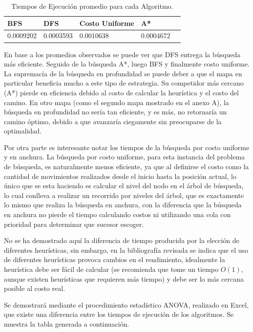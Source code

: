 \documentclass[letter, titlepage, 10pt]{article}
\begin{document}
\begin{table}[H]
\begin{center}
\begin{tabular}{|l|l|l|l|l|}
\hline
\textbf{BFS} & \textbf{DFS}  & \textbf{Costo Uniforme}   & \textbf{A*}   \\ \hline
0.0009202 & 0.0003593 & 0.0010638 & 0.0004672
\\ \hline
\end{tabular}
\caption{Tiempos de Ejecución promedio para cada Algoritmo.}
\end{center}
\end{table}

En base a los promedios observados se puede ver que DFS entrega la búsqueda más eficiente. Seguido de la búsqueda A*, luego BFS y finalmente costo uniforme. La supremacía de la búsqueda en profundidad se puede deber a que el mapa en particular beneficia mucho a este tipo de estrategia. Su competidor más cercano (A*) pierde en eficiencia debido al costo de calcular la heurística y el costo del camino. En otro mapa (como el segundo mapa mostrado en el anexo A), la búsqueda en profundidad no sería tan eficiente, y es más, no retornaría un camino óptimo, debido a que avanzaría ciegamente sin preocuparse de la optimalidad.

Por otra parte es interesante notar los tiempos de la búsqueda por costo uniforme y en anchura. La búsqueda por costo uniforme, para esta instancia del problema de búsqueda, es naturalmente menos eficiente, ya que al definirse el costo como la cantidad de movimientos realizados desde el inicio hasta la posición actual, lo único que se esta haciendo es calcular el nivel del nodo en el árbol de búsqueda, lo cual conlleva a realizar un recorrido por niveles del árbol, que es exactamente lo mismo que realiza la búsqueda en anchura, con la diferencia que la búsqueda en anchura no pierde el tiempo calculando costos ni utilizando una cola con prioridad para determinar que sucesor escoger.

No se ha demostrado aquí la diferencia de tiempo producida por la elección de diferentes heurísticas, sin embargo, en la bibliografía revisada se indica que el uso de diferentes heurísticas provoca cambios en el rendimiento, idealmente la heurística debe ser fácil de calcular (se recomienda que tome un tiempo $O(1)$, aunque existen heurísticas que requieren más tiempo) y debe ser lo más cercana posible al costo real.

Se demostrará mediante el procedimiento estadístico ANOVA, realizado en Excel, que existe una diferencia entre los tiempos de ejecución de los algoritmos. Se muestra la tabla generada a continuación.
\end{document}
